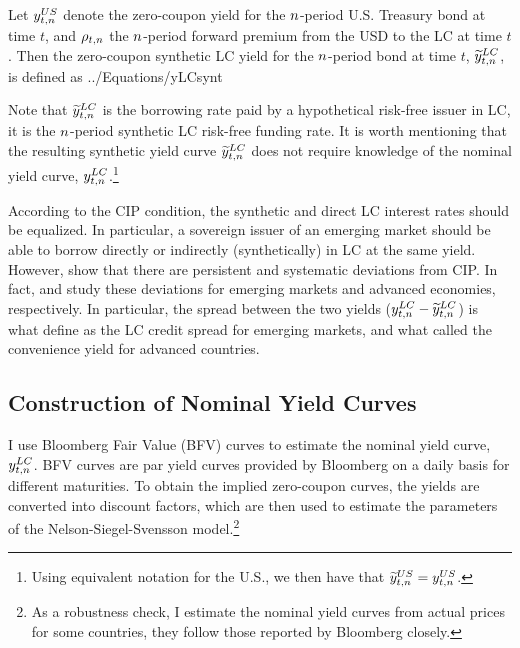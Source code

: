 Let $y_{t,n} ^{US}$ denote the zero-coupon yield for the $n$-period U.S. Treasury bond at time $t$, and $\rho_{t,n}$ the $n$-period forward premium from the USD to the LC at time $t$. Then the zero-coupon synthetic LC yield for the $n$-period bond at time $t$, $\widetilde{y}_{t,n} ^{LC}$, is defined as
	 {../Equations/yLCsynt}

Note that $\widetilde{y}_{t,n} ^{LC}$ is the borrowing rate paid by a hypothetical risk-free issuer in LC, it is the $n$-period synthetic LC risk-free funding rate. It is worth mentioning that the resulting synthetic yield curve $\widetilde{y}_{t,n} ^{LC}$ does not require knowledge of the nominal yield curve, $y_{t,n} ^{LC}$.\footnote{Using equivalent notation for the U.S., we then have that $\widetilde{y}_{t,n} ^{US} = y_{t,n} ^{US}$.}

According to the CIP condition, the synthetic and direct LC interest rates should be equalized. In particular, a sovereign issuer of an emerging market should be able to borrow directly or indirectly (synthetically) in LC at the same yield. However, \cite*{DuTepperVerdelhan:2018} show that there are persistent and systematic deviations from CIP. In fact, \cite{DuSchreger:2016a} and \cite{DuImSchreger:2018} study these deviations for emerging markets and advanced economies, respectively. In particular, the spread between the two yields ($y_{t,n} ^{LC} - \widetilde{y}_{t,n} ^{LC}$) is what \cite{DuSchreger:2016a} define as the LC credit spread for emerging markets, and what \cite{DuImSchreger:2018} called the convenience yield for advanced countries.

\subsection{Construction of Nominal Yield Curves}
I use Bloomberg Fair Value (BFV) curves to estimate the nominal yield curve, $y_{t,n} ^{LC}$. BFV curves are par yield curves provided by Bloomberg on a daily basis for different maturities. To obtain the implied zero-coupon curves, the yields are converted into discount factors, which are then used to estimate the parameters of the Nelson-Siegel-Svensson model.\footnote{As a robustness check, I estimate the nominal yield curves from actual prices for some countries, they follow those reported by Bloomberg closely.}


